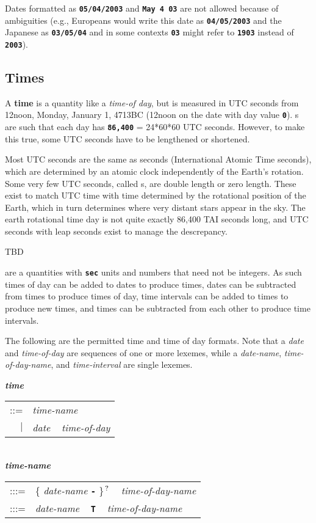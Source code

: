 \documentclass[12pt]{article}
\newcommand{\TT}[1]{{\tt \bfseries #1}}
\newcommand{\key}[1]{{\rm \bfseries #1}}
\newcommand{\emkey}[1]{{\em \bfseries #1}}
\newcommand{\QMARK}{{$^{\,\mbox{\footnotesize ?}}$}}
\newenvironment{indpar}[1][0.3in]%
	{\begin{list}{}%
		     {\setlength{\itemsep}{0in}%
		      \setlength{\topsep}{0in}%
		      \setlength{\parsep}{1ex}%
		      \setlength{\labelwidth}{#1}%
		      \setlength{\leftmargin}{#1}%
		      \addtolength{\leftmargin}{\labelsep}}%
	 \item}%
	{\end{list}}
\begin{document}
Dates formatted as \TT{05/04/2003} and \TT{May 4 03} are not allowed
because of ambiguities (e.g., Europeans would write this date as
\TT{04/05/2003} and the Japanese as \TT{03/05/04} and in some contexts
\TT{03} might refer to \TT{1903} instead of \TT{2003}).

\subsection{Times}
\label{TIMES}


A \key{time} is a quantity like a {\em time-of day}, but is measured
in UTC seconds from 12noon, Monday, January 1, 4713BC (12noon on
the date with day value \TT{0}).  s are such that
each day has \TT{86,400} = 24*60*60 UTC seconds.  However, to make
this true, some UTC seconds have to be lengthened or shortened.

Most UTC seconds are the same as  seconds (International
Atomic Time seconds), which are determined by an atomic clock
independently of the Earth's rotation.  Some very few UTC seconds, called
s, are double length or zero length.  
These exist to match UTC time with time determined by the rotational
position of the Earth, which in turn determines where very distant
stars appear in the sky.  The earth rotational time day is not quite
exactly 86,400 TAI seconds long, and UTC seconds with
leap seconds exist to manage the descrepancy.

TBD

are a quantities with \TT{sec} units
and numbers that need not be integers.  As such times of day can be added
to dates to produce times, dates can be subtracted from times to produce
times of day, time intervals can be added to times to produce new
times, and times can be subtracted from each other to
produce time intervals.

The following are the permitted time and time of day formats.
Note that a {\em date} and {\em time-of-day}
are sequences of one or more lexemes, while a {\em date-name},
{\em time-of-day-name}, and {\em time-interval} are single lexemes.

\begin{indpar}
\emkey{time} \begin{tabular}[t]{rl}
     ::= & {\em time-name} \\
     $|$ & {\em date} ~ {\em time-of-day} \\
    \end{tabular}
\label{TIME}
\\[1ex]
\emkey{time-name} \begin{tabular}[t]{rl}
    :::= & \{ {\em date-name} \TT{-} \}\QMARK{} ~ {\em time-of-day-name} \\
    :::= & {\em date-name} ~ \TT{T} ~ {\em time-of-day-name} \\
    \end{tabular}
\end{indpar}
\end{document}
